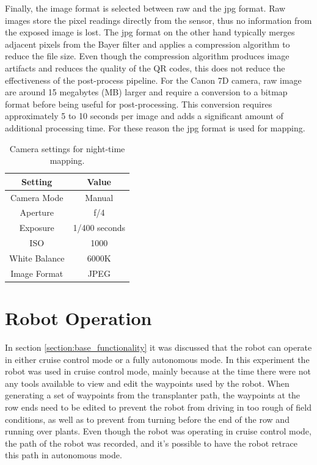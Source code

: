 Finally, the image format is selected between raw and the \ac{jpg} format.  Raw images store the pixel readings directly from the sensor, thus no information from the exposed image is lost.  The \ac{jpg} format on the other hand typically merges adjacent pixels from the Bayer filter and applies a compression algorithm to reduce the file size.  Even though the compression algorithm produces image artifacts and reduces the quality of the QR codes, this does not reduce the effectiveness of the post-process pipeline. For the Canon 7D camera, raw image are around 15 megabytes (MB) larger and require a conversion to a bitmap format before being useful for post-processing.  This conversion requires approximately 5 to 10 seconds per image and adds a significant amount of additional processing time.  For these reason the \ac{jpg} format is used for mapping.

\begin{table}[htb]
    \begin{center}
    \caption[Camera Settings]{Camera settings for night-time mapping.}
    \begin{tabular}[c]{|c|c|}
        \hline
        Setting & Value \\
        \hline
        Camera Mode     & Manual        \\
        Aperture & f/4          \\
        Exposure & 1/400 seconds   \\
        ISO      & 1000  \\
        White Balance & 6000K \\
        Image Format & JPEG \\
        \hline
    \end{tabular}
    \label{table:camera_settings}
   \end{center}
\end{table}


\section{Robot Operation}

In section \ref{section:base_functionality} it was discussed that the robot can operate in either cruise control mode or a fully autonomous mode.  In this experiment the robot was used in cruise control mode, mainly because at the time there were not any tools available to view and edit the waypoints used by the robot.  When generating a set of waypoints from the transplanter path, the waypoints at the row ends need to be edited to prevent the robot from driving in too rough of field conditions, as well as to prevent from turning before the end of the row and running over plants.  Even though the robot was operating in cruise control mode, the path of the robot was recorded, and it's possible to have the robot retrace this path in autonomous mode.
